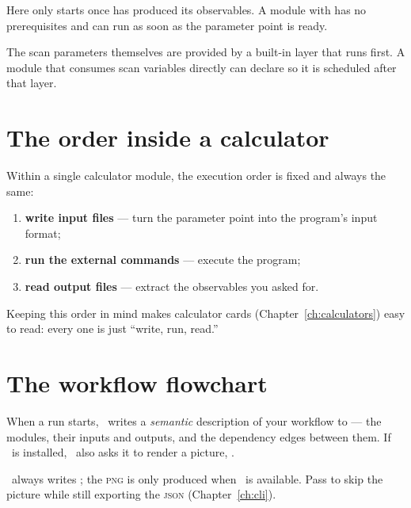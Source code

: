 \noindent Here  only starts once  has produced its
observables. A module with  has no prerequisites and can run as
soon as the parameter point is ready.

\begin{jnote}
The scan parameters themselves are provided by a built-in  layer that runs
first. A module that consumes scan variables directly can declare
 so it is scheduled after that layer.
\end{jnote}

\section{The order inside a calculator}
\label{sec:wf-calc-order}

Within a single calculator module, the execution order is fixed and always the same:

\begin{enumerate}
  \item \textbf{write input files} --- turn the parameter point into the program's input format;
  \item \textbf{run the external commands} --- execute the program;
  \item \textbf{read output files} --- extract the observables you asked for.
\end{enumerate}

\noindent Keeping this order in mind makes calculator cards (Chapter~\ref{ch:calculators}) easy
to read: every one is just ``write, run, read.''

\section{The workflow flowchart}
\label{sec:wf-flowchart}

When a run starts, \Jarvis\ writes a \emph{semantic} description of your workflow to
 --- the modules, their inputs and outputs, and the
dependency edges between them. If \JPlot\ is installed, \Jarvis\ also asks it to render a
picture, .

\begin{jnote}
\Jarvis\ always writes ; the \textsc{png} is only produced when \JPlot\ is
available. Pass  to skip the picture while still exporting the
\textsc{json} (Chapter~\ref{ch:cli}).
\end{jnote}

